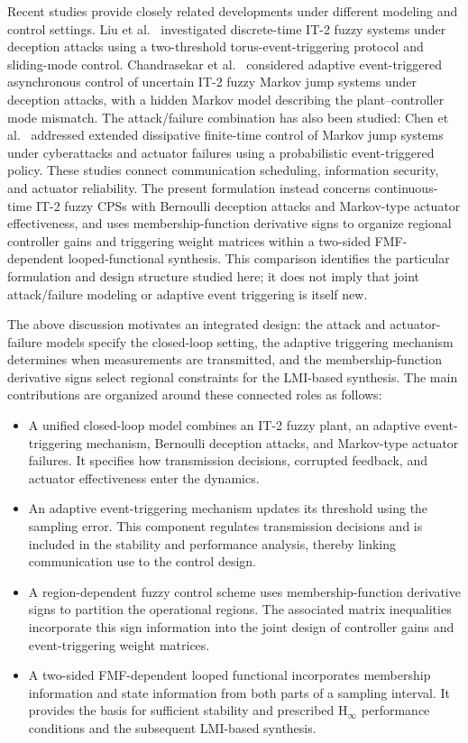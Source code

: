 \documentclass[preprint,review,fleqn,sort&compress,3p]{elsarticle}
\theoremstyle{definition} %
\theoremstyle{definition}%
\begin{document}
Recent studies provide closely related developments under different modeling and control settings. Liu et al.\ \cite{liuTorusEventBased2025} investigated discrete-time IT-2 fuzzy systems under deception attacks using a two-threshold torus-event-triggering protocol and sliding-mode control. Chandrasekar et al.\ \cite{chandrasekarAdaptiveEvent2026} considered adaptive event-triggered asynchronous control of uncertain IT-2 fuzzy Markov jump systems under deception attacks, with a hidden Markov model describing the plant--controller mode mismatch. The attack/failure combination has also been studied: Chen et al.\ \cite{chenProbabilisticEventTriggeredPolicy2023} addressed extended dissipative finite-time control of Markov jump systems under cyberattacks and actuator failures using a probabilistic event-triggered policy. These studies connect communication scheduling, information security, and actuator reliability. The present formulation instead concerns continuous-time IT-2 fuzzy CPSs with Bernoulli deception attacks and Markov-type actuator effectiveness, and uses membership-function derivative signs to organize regional controller gains and triggering weight matrices within a two-sided FMF-dependent looped-functional synthesis. This comparison identifies the particular formulation and design structure studied here; it does not imply that joint attack/failure modeling or adaptive event triggering is itself new.

The above discussion motivates an integrated design: the attack and actuator-failure models specify the closed-loop setting, the adaptive triggering mechanism determines when measurements are transmitted, and the membership-function derivative signs select regional constraints for the LMI-based synthesis. The main contributions are organized around these connected roles as follows:

\begin{itemize}
	\item[1)] A unified closed-loop model combines an IT-2 fuzzy plant, an adaptive event-triggering mechanism, Bernoulli deception attacks, and Markov-type actuator failures. It specifies how transmission decisions, corrupted feedback, and actuator effectiveness enter the dynamics.
	\item[2)] An adaptive event-triggering mechanism updates its threshold using the sampling error. This component regulates transmission decisions and is included in the stability and performance analysis, thereby linking communication use to the control design.
	\item[3)] A region-dependent fuzzy control scheme uses membership-function derivative signs to partition the operational regions. The associated matrix inequalities incorporate this sign information into the joint design of controller gains and event-triggering weight matrices.
	\item[4)] A two-sided FMF-dependent looped functional incorporates membership information and state information from both parts of a sampling interval. It provides the basis for sufficient stability and prescribed $\mathrm{H}_\infty$ performance conditions and the subsequent LMI-based synthesis.
\end{itemize}
\end{document}
